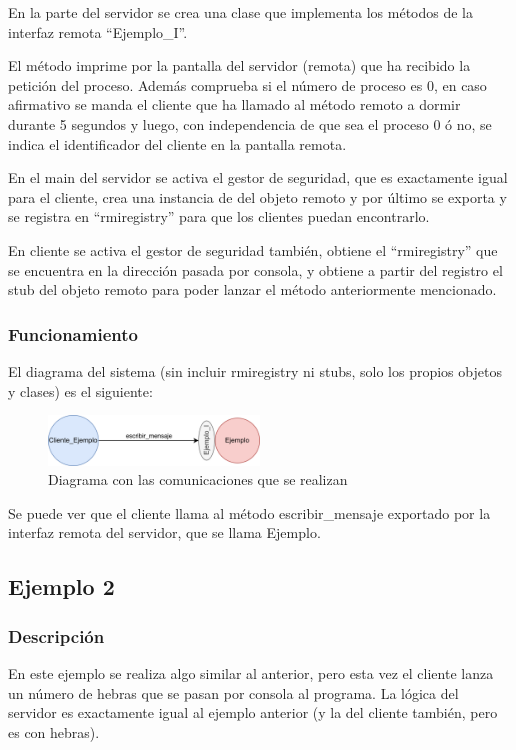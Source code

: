 \documentclass{article}
\begin{document}
\bigskip

En la parte del servidor se crea una clase que implementa los métodos de la interfaz remota ``Ejemplo\_I''.

\bigskip

El método imprime por la pantalla del servidor (remota) que ha recibido la petición del proceso. Además comprueba si el número de proceso es 0, en caso afirmativo se manda el cliente que ha llamado al método remoto a dormir durante 5 segundos y luego, con independencia de que sea el proceso 0 ó no, se indica el identificador del cliente en la pantalla remota.

\bigskip

En el main del servidor se activa el gestor de seguridad, que es exactamente igual para el cliente, crea una instancia de del objeto remoto y por último se exporta y se registra en ``rmiregistry'' para que los clientes puedan encontrarlo.

\bigskip

En cliente se activa el gestor de seguridad también, obtiene el ``rmiregistry'' que se encuentra en la dirección pasada por consola, y obtiene a partir del registro el stub del objeto remoto para poder lanzar el método anteriormente mencionado.


\subsubsection{Funcionamiento}
El diagrama del sistema (sin incluir rmiregistry ni stubs, solo los propios objetos y clases) es el siguiente:

\begin{figure}[H]
    \centering
    \includegraphics[width=0.5\textwidth]{imagenes/E1Diagrama.png}
    \caption{Diagrama con las comunicaciones que se realizan}
\end{figure}

Se puede ver que el cliente llama al método escribir\_mensaje exportado por la interfaz remota del servidor, que se llama Ejemplo.

\subsection{Ejemplo 2}
\subsubsection{Descripción}
En este ejemplo se realiza algo similar al anterior, pero esta vez el cliente lanza un número de hebras que se pasan por consola al programa. La lógica del servidor es exactamente igual al ejemplo anterior (y la del cliente también, pero es con hebras).
\end{document}

